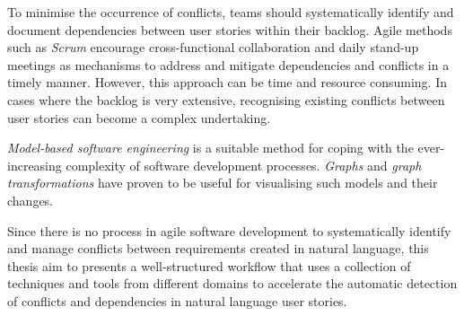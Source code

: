 To minimise the occurrence of conflicts, teams should systematically identify and document dependencies between user stories within their backlog. Agile methods such as \emph{Scrum} encourage cross-functional collaboration and daily stand-up meetings as mechanisms to address and mitigate dependencies and conflicts in a timely manner. However, this approach can be time and resource consuming. In cases where the backlog is very extensive, recognising existing conflicts between user stories can become a complex undertaking.

\emph{Model-based software engineering} is a suitable method for coping with the ever-increasing complexity of software development processes. \emph{Graphs} and \emph{graph transformations} have proven to be useful for visualising such models and their changes.

Since there is no process in agile software development to systematically identify and manage conflicts between requirements created in natural language, this thesis aim to presents a well-structured workflow that uses a collection of techniques and tools from different domains to accelerate the automatic detection of conflicts and dependencies in natural language user stories.
